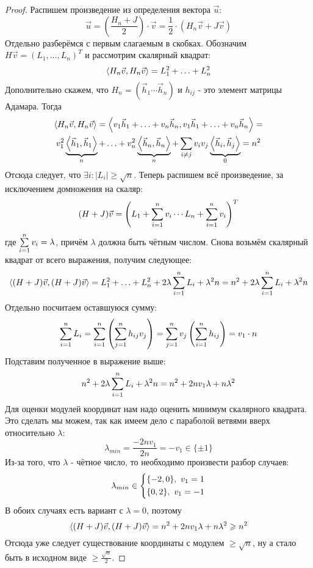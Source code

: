 \begin{enumerate}
\begin{proof}
		Распишем произведение из определения вектора $\vec{u}$:
		\[
			\vec{u} = \left(\frac{H_n + J}{2}\right) \cdot \vec{v} = \frac{1}{2} \cdot (H_n \vec{v} + J \vec{v})
		\]
		Отдельно разберёмся с первым слагаемым в скобках. Обозначим $H\vec{v} = (L_1, \ldots, L_n)^T$ и рассмотрим скалярный квадрат:
		\[
			\left\langle H_n \vec{v}, H_n \vec{v} \right\rangle = L_1^2 + \ldots + L_n^2
		\]
		Дополнительно скажем, что $H_n = (\vec{h}_1 \cdots \vec{h}_n)$ и $h_{ij}$ - это элемент матрицы Адамара. Тогда
		\begin{multline*}
			\left\langle H_n \vec{v}, H_n \vec{v} \right\rangle = \left\langle v_1\vec{h}_1 + \ldots + v_n\vec{h}_n, v_1\vec{h}_1 + \ldots + v_n\vec{h}_n \right\rangle =
			\\
			v_1^2 \underbrace{\left\langle \vec{h}_1, \vec{h}_1 \right\rangle}_{n} + \ldots + v_n^2 \underbrace{\left\langle \vec{h}_n, \vec{h}_n \right\rangle}_{n} + \sum\limits_{i \neq j} v_i v_j \underbrace{\left\langle \vec{h}_i, \vec{h}_j \right\rangle}_{0} = n^2
		\end{multline*}
		Отсюда следует, что $\exists i \colon |L_i| \ge \sqrt{n}$. Теперь распишем всё произведение, за исключением домножения на скаляр:
		\[
			(H + J)\vec{v} = \left(L_1 + \sum\limits_{i = 1}^n v_i \cdots L_n + \sum\limits_{i = 1}^n v_i\right)^T
		\]
		где $\sum\limits_{i = 1}^n v_i = \lambda$, причём $\lambda$ должна быть чётным числом. Снова возьмём скалярный квадрат от всего выражения, получим следующее:
		\[
			\left\langle (H + J)\vec{v}, (H + J)\vec{v} \right\rangle = L_1^2 + \ldots + L_n^2 + 2\lambda \sum\limits_{i = 1}^n L_i + \lambda^2 n = n^2 + 2\lambda \sum\limits_{i = 1}^n L_i + \lambda^2 n
		\]
		Отдельно посчитаем оставшуюся сумму:
		\[
			\sum\limits_{i = 1}^n L_i = \sum\limits_{i = 1}^n \left(\sum\limits_{j = 1}^n h_{ij} v_j\right) = \sum\limits_{j = 1}^n v_j \left(\sum\limits_{i = 1}^n h_{ij}\right) = v_1 \cdot n
		\]
		Подставим полученное в выражение выше:
		\[
			n^2 + 2\lambda \sum\limits_{i = 1}^n L_i + \lambda^2 n = n^2 + 2nv_1 \lambda + n\lambda^2
		\]
		Для оценки модулей координат нам надо оценить минимум скалярного квадрата. Это сделать мы можем, так как имеем дело с параболой ветвями вверх относительно $\lambda$:
		\[
			\lambda_{min} = \frac{-2nv_1}{2n} = -v_1 \in \{\pm 1\}
		\]
		Из-за того, что $\lambda$ - чётное число, то необходимо произвести разбор случаев:
		\[
			\lambda_{min} \in \left\{\begin{aligned}
				&{\{-2, 0\},\ v_1 = 1}
				\\
				&{\{0, 2\},\ v_1 = -1}
			\end{aligned}\right.
		\]
		В обоих случаях есть вариант с $\lambda = 0$, поэтому
		\[
			\left\langle (H + J)\vec{v}, (H + J)\vec{v} \right\rangle = n^2 + 2nv_1\lambda + n\lambda^2 \geqslant n^2
		\]
		Отсюда уже следует существование координаты с модулем $\ge \sqrt{n}$, ну а стало быть в исходном виде $\ge \frac{\sqrt{n}}{2}$.
	\end{proof}
	

\end{enumerate}
